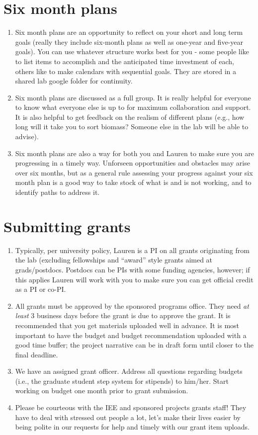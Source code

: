 \documentclass[12pt]{article}
\begin{document}
\section{Six month plans}
\begin{enumerate}
\item Six month plans are an opportunity to reflect on your short and long term goals (really they include six-month plans as well as one-year and five-year goals). You can use whatever structure works best for you - some people like to list items to accomplish and the anticipated time investment of each, others like to make calendars with sequential goals. They are stored in a shared lab google folder for continuity.  
\item Six month plans are discussed as a full group. It is really helpful for everyone to know what everyone else is up to for maximum collaboration and support. It is also helpful to get feedback on the realism of different plans (e.g., how long will it take you to sort biomass? Someone else in the lab will be able to advise). 
\item Six month plans are also a way for both you and Lauren to make sure you are progressing in a timely way. Unforseen opportunities and obstacles may arise over six months, but as a general rule assessing your progress against your six month plan is a good way to take stock of what is and is not working, and to identify paths to address it.
\end{enumerate}


\section{Submitting grants}
\begin{enumerate}
\item Typically, per university policy, Lauren is a PI on all grants originating from
  the lab (excluding fellowships and ``award'' style grants aimed at grads/postdocs. Postdocs can be PIs with some funding agencies, however; if this applies Lauren will work with you to make sure you can get official credit as a PI or co-PI.
\item All grants must be approved by the sponsored programs office. They need \textit{at least} 3 business days before the grant is due to approve the grant. It is recommended that you get materials uploaded well in advance. It is most important to have the budget and budget recommendation uploaded with a good time buffer; the project narrative can be in draft form until closer to the final deadline.  
\item We have an assigned grant officer.  Address all questions regarding budgets (i.e., the graduate student step system for stipends) to him/her. Start working on budget one month prior to grant submission.
\item Please be courteous with the IEE and sponsored projects grants staff! They have to deal with stressed out people a lot, let's make their lives easier by being polite in our requests for help and timely with our grant item uploads.
\end{enumerate}
\end{document}
